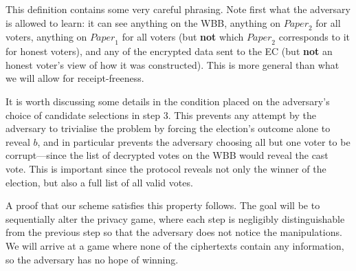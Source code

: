 \documentclass[12pt,a4paper]{article}
\theoremstyle{definition}
\newcommand{\Paper}{\mathit{Paper}}
\begin{document}
This definition contains some very careful phrasing. Note first what the adversary is allowed to learn: it can see anything on the WBB, anything on $\Paper_2$ for all voters, anything on $\Paper_1$ for all voters (but \textbf{not} which $\Paper_2$ corresponds to it for honest voters), and any of the encrypted data sent to the EC (but \textbf{not} an honest voter's view of how it was constructed). This is more general than what we will allow for receipt-freeness.

It is worth discussing some details in the condition placed on the adversary's choice of candidate selections in step 3. This prevents any attempt by the adversary to trivialise the problem by forcing the election's outcome alone to reveal $b$, and in particular prevents the adversary choosing all but one voter to be corrupt---since the list of decrypted votes on the WBB would reveal the cast vote. This is important since the protocol reveals not only the winner of the election, but also a full list of all valid votes.

A proof that our scheme satisfies this property follows. The goal will be to sequentially alter the privacy game, where each step is negligibly distinguishable from the previous step so that the adversary does not notice the manipulations. We will arrive at a game where none of the ciphertexts contain any information, so the adversary has no hope of winning.
\end{document}

